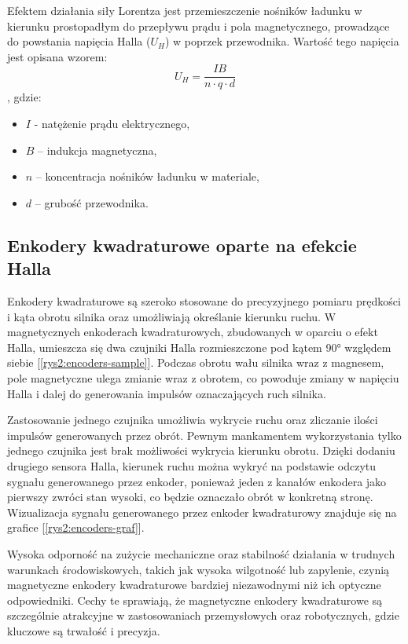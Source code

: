 Efektem działania siły Lorentza jest przemieszczenie nośników ładunku w kierunku prostopadłym do przepływu prądu i pola magnetycznego, prowadzące do powstania napięcia Halla (\( U_H \)) w poprzek przewodnika. Wartość tego napięcia jest opisana wzorem:
\[
U_H = \frac{I B}{n \cdot q \cdot d}
\]
, gdzie:
\begin{itemize}
    \item \( I \) - natężenie prądu elektrycznego,
    \item \( B \) – indukcja magnetyczna,
    \item \( n \) – koncentracja nośników ładunku w materiale,
    \item \( d \) – grubość przewodnika.
\end{itemize}

\subsection{Enkodery kwadraturowe oparte na efekcie Halla}

Enkodery kwadraturowe są szeroko stosowane do precyzyjnego pomiaru prędkości i kąta obrotu silnika oraz umożliwiają określanie kierunku ruchu. W magnetycznych enkoderach kwadraturowych, zbudowanych w oparciu o efekt Halla, umieszcza się dwa czujniki Halla rozmieszczone pod kątem 90° względem siebie [\ref{rys2:encoders-sample}]. Podczas obrotu wału silnika wraz z magnesem, pole magnetyczne ulega zmianie wraz z obrotem, co powoduje zmiany w napięciu Halla i dalej do generowania impulsów oznaczających ruch silnika. 

Zastosowanie jednego czujnika umożliwia wykrycie ruchu oraz zliczanie ilości impulsów generowanych przez obrót. Pewnym mankamentem wykorzystania tylko jednego czujnika jest brak możliwości wykrycia kierunku obrotu. Dzięki dodaniu drugiego sensora Halla, kierunek ruchu można wykryć na podstawie odczytu sygnału generowanego przez enkoder, ponieważ jeden z kanałów enkodera jako pierwszy zwróci stan wysoki, co będzie oznaczało obrót w konkretną stronę. Wizualizacja sygnału generowanego przez enkoder kwadraturowy znajduje się na grafice [\ref{rys2:encoders-graf}].

Wysoka odporność na zużycie mechaniczne oraz stabilność działania w trudnych warunkach środowiskowych, takich jak wysoka wilgotność lub zapylenie, czynią magnetyczne enkodery kwadraturowe bardziej niezawodnymi niż ich optyczne odpowiedniki. Cechy te sprawiają, że magnetyczne enkodery kwadraturowe są szczególnie atrakcyjne w zastosowaniach przemysłowych oraz robotycznych, gdzie kluczowe są trwałość i precyzja.

